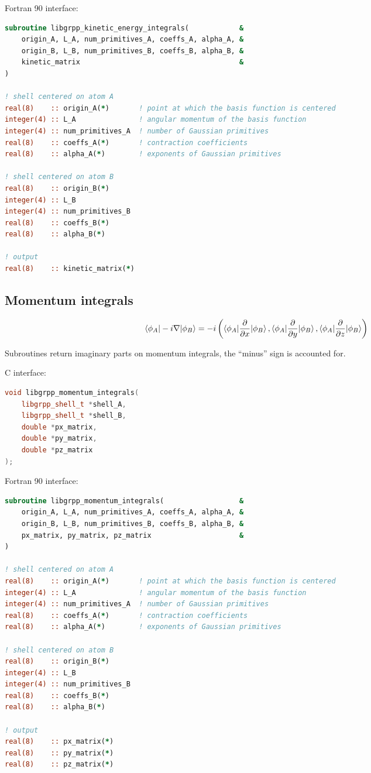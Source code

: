 \documentclass[12pt]{article}
\begin{document}
Fortran 90 interface:
\begin{lstlisting}[language=Fortran]
subroutine libgrpp_kinetic_energy_integrals(            &
    origin_A, L_A, num_primitives_A, coeffs_A, alpha_A, &
    origin_B, L_B, num_primitives_B, coeffs_B, alpha_B, &
    kinetic_matrix                                      &
)

! shell centered on atom A
real(8)    :: origin_A(*)       ! point at which the basis function is centered
integer(4) :: L_A               ! angular momentum of the basis function
integer(4) :: num_primitives_A  ! number of Gaussian primitives
real(8)    :: coeffs_A(*)       ! contraction coefficients
real(8)    :: alpha_A(*)        ! exponents of Gaussian primitives

! shell centered on atom B
real(8)    :: origin_B(*)
integer(4) :: L_B
integer(4) :: num_primitives_B
real(8)    :: coeffs_B(*)
real(8)    :: alpha_B(*)

! output
real(8)    :: kinetic_matrix(*)
\end{lstlisting}


\subsection{Momentum integrals}

\begin{equation}
\braket{\phi_A|-i\nabla|\phi_B} = 
-i \left(
\braket{\phi_A|\frac{\partial}{\partial x}|\phi_B},
\braket{\phi_A|\frac{\partial}{\partial y}|\phi_B},
\braket{\phi_A|\frac{\partial}{\partial z}|\phi_B}
\right)
\end{equation}

Subroutines return imaginary parts on momentum integrals, the ``minus'' sign is accounted for.

C interface:
\begin{lstlisting}[language=C++]
void libgrpp_momentum_integrals(
    libgrpp_shell_t *shell_A,
    libgrpp_shell_t *shell_B,
    double *px_matrix,
    double *py_matrix,
    double *pz_matrix
);
\end{lstlisting}

Fortran 90 interface:
\begin{lstlisting}[language=Fortran]
subroutine libgrpp_momentum_integrals(                  &
    origin_A, L_A, num_primitives_A, coeffs_A, alpha_A, &
    origin_B, L_B, num_primitives_B, coeffs_B, alpha_B, &
    px_matrix, py_matrix, pz_matrix                     &
)

! shell centered on atom A
real(8)    :: origin_A(*)       ! point at which the basis function is centered
integer(4) :: L_A               ! angular momentum of the basis function
integer(4) :: num_primitives_A  ! number of Gaussian primitives
real(8)    :: coeffs_A(*)       ! contraction coefficients
real(8)    :: alpha_A(*)        ! exponents of Gaussian primitives

! shell centered on atom B
real(8)    :: origin_B(*)
integer(4) :: L_B
integer(4) :: num_primitives_B
real(8)    :: coeffs_B(*)
real(8)    :: alpha_B(*)

! output
real(8)    :: px_matrix(*)
real(8)    :: py_matrix(*)
real(8)    :: pz_matrix(*)
\end{lstlisting}
\end{document}

